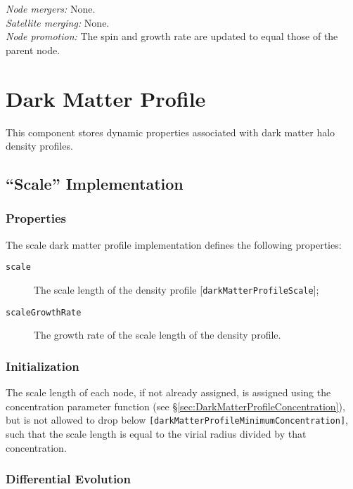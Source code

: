 \noindent\emph{Node mergers:} None.\\

\noindent\emph{Satellite merging:} None.\\

\noindent\emph{Node promotion:} The spin and growth rate are updated to equal those of the parent node.\\

\section{Dark Matter Profile}\label{sec:DarkMatterProfileComponent}

This \gls{component} stores dynamic properties associated with dark matter halo density profiles.

\subsection{``Scale'' Implementation}\label{sec:DarkMatterProfileScale}

\subsubsection{Properties}

The scale dark matter profile implementation defines the following properties:
\begin{description}
 \item [{\tt scale}] The scale length of the density profile [{\tt darkMatterProfileScale}];
 \item [{\tt scaleGrowthRate}] The growth rate of the scale length of the density profile.
\end{description}

\subsubsection{Initialization}

The scale length of each node, if not already assigned, is assigned using the concentration parameter function (see \S\ref{sec:DarkMatterProfileConcentration}), but is not allowed to drop below {\tt [darkMatterProfileMinimumConcentration]}, such that the scale length is equal to the virial radius divided by that concentration.

\subsubsection{Differential Evolution}

